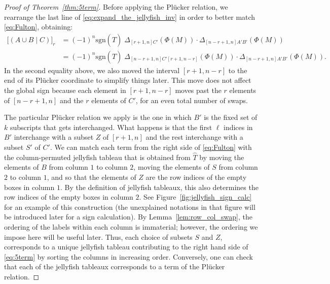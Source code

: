 \documentclass[10pt]{amsart}
\theoremstyle{definition}
\theoremstyle{plain}
\theoremstyle{plain}
\theoremstyle{definition}
\theoremstyle{remark}
\theoremstyle{plain}
\theoremstyle{plain}
\theoremstyle{plain}
\numberwithin{equation}{section}
\newcommand{\sgn}{\mathrm{sgn}}
\begin{document}
\begin{proof}[Proof of Theorem~\ref{thm:5term}]
Before applying the Pl\"ucker relation, we rearrange the last line of \eqref{eq:expand_the_jellyfish_inv} in order to better match \eqref{eq:Fulton}, obtaining:
\begin{equation}\label{eq:expand_the_jellyfish_inv_some_more}
\begin{split}
        \big[(A\cup B \mid C)\big]_r 
        &= (-1)^n \sgn(\widehat{T}) \;   \Delta_{[r+1, n]  C'}(\Phi(M)) \cdot \Delta_{[n-r + 1, n]  A'B'}(\Phi(M)) \\
        &= (-1)^n \sgn(\widehat{T}) \;   \Delta_{[n-r+1, n]  C'  [r+1,n-r]}(\Phi(M)) \cdot \Delta_{[n-r + 1, n]  A' B'}(\Phi(M)). 
        \end{split}
        \end{equation}
In the second equality above, we also moved the interval $[r+1,n-r]$ to the end of its Pl\"ucker coordinate to simplify things later. This move does not affect the global sign because each element in $[r+1,n-r]$ moves past the $r$ elements of $[n-r+1,n]$ and the $r$ elements of $C'$, for an even total number of swaps.

The particular Pl\"ucker relation we apply is the one in which $B'$ is the fixed set of $k$ subscripts that gets interchanged. What happens is that the first $\ell$ indices in $B'$ interchange with a subset $Z$ of $[r+1,n]$ and the rest interchange with a subset $S'$ of $C'$. We can match each term from the right side of \eqref{eq:Fulton} with the column-permuted jellyfish tableau that is obtained from $\widehat{T}$ by moving the elements of $B$ from column $1$ to column $2$, moving the elements of $S$ from column $2$ to column $1$, and so that the elements of $Z$ are the row indices of the empty boxes in column $1$. By the definition of jellyfish tableaux, this also determines the row indices of the empty boxes in column $2$. See Figure~\ref{fig:jellyfish_sign_calc} for an example of this construction (the unexplained notations in that figure will be introduced later for a sign calculation). By Lemma~\ref{lem:row_col_swap}, the ordering of the labels within each column is immaterial; however, the ordering we impose here will be useful later. Thus, each choice of subsets $S$ and $Z$, corresponds to a unique jellyfish tableau contributing to the right hand side of \eqref{eq:5term} by sorting the columns in increasing order. Conversely, one can check that each of the jellyfish tableaux corresponds to a term of the Pl\"ucker relation.


\end{proof}
\end{document}
